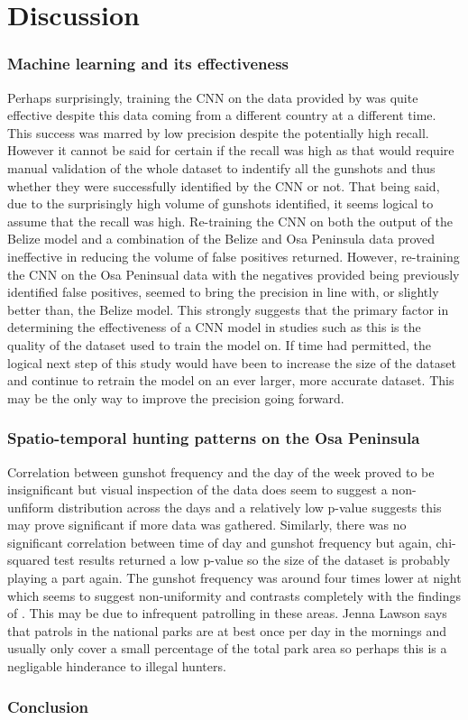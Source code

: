 
\chapter{Discussion} %

\label{Discussion} %

\subsection{Machine learning and its effectiveness}
Perhaps surprisingly, training the CNN on the data provided by \cite{Hill2018} was quite effective despite this data coming from a different country at a different time. This success was marred by low precision despite the potentially high recall. However it cannot be said for certain if the recall was high as that would require manual validation of the whole dataset to indentify all the gunshots and thus whether they were successfully identified by the CNN or not. That being said, due to the surprisingly high volume of gunshots identified, it seems logical to assume that the recall was high. Re-training the CNN on both the output of the Belize model and a combination of the Belize and Osa Peninsula data proved ineffective in reducing the volume of false positives returned. However, re-training the CNN on the Osa Peninsual data with the negatives provided being previously identified false positives, seemed to bring the precision in line with, or slightly better than, the Belize model. This strongly suggests that the primary factor in determining the effectiveness of a CNN model in studies such as this is the quality of the dataset used to train the model on. If time had permitted, the logical next step of this study would have been to increase the size of the dataset and continue to retrain the model on an ever larger, more accurate dataset. This may be the only way to improve the precision going forward.


\subsection{Spatio-temporal hunting patterns on the Osa Peninsula}
Correlation between gunshot frequency and the day of the week proved to be insignificant but visual inspection of the data does seem to suggest a non-unfiform distribution across the days and a relatively low p-value suggests this may prove significant if more data was gathered. Similarly, there was no significant correlation between time of day and gunshot frequency but again, chi-squared test results returned a low p-value so the size of the dataset is probably playing a part again. The gunshot frequency was around four times lower at night which seems to suggest non-uniformity and contrasts completely with the findings of \cite{Astaras2017}. This may be due to infrequent patrolling in these areas. Jenna Lawson says that patrols in the national parks are at best once per day in the mornings and usually only cover a small percentage of the total park area so perhaps this is a negligable hinderance to illegal hunters. 


\subsection{Conclusion}
